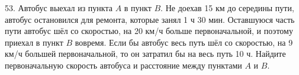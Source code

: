 53. Автобус выехал из пункта $A$ в пункт $B.$ Не доехав 15 км до середины пути, автобус остановился для ремонта, которые занял 1 ч 30 мин. Оставшуюся часть пути автобус шёл со скоростью, на 20 км/ч больше первоначальной, и поэтому приехал в пункт $B$ вовремя. Если бы автобус весь путь шёл со скоростью, на 9 км/ч большей первоначальной, то он затратил бы на весь путь 10 ч. Найдите первоначальную скорость автобуса и расстояние между пунктами $A$ и $B.$\\
